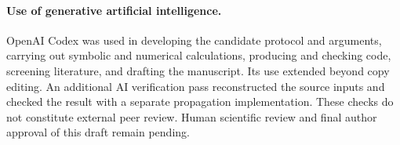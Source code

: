 \documentclass[11pt,a4paper]{article}
\begin{document}
\paragraph{Use of generative artificial intelligence.}
OpenAI Codex was used in developing the candidate protocol and arguments, carrying out symbolic and numerical calculations, producing and checking code, screening literature, and drafting the manuscript. Its use extended beyond copy editing. An additional AI verification pass reconstructed the source inputs and checked the result with a separate propagation implementation. These checks do not constitute external peer review. Human scientific review and final author approval of this draft remain pending.



\end{document}
